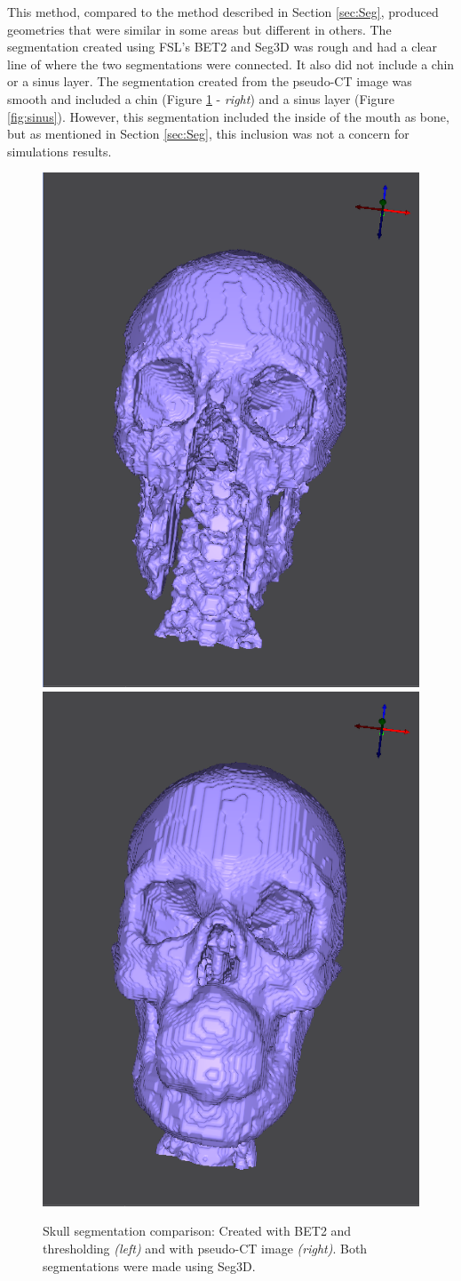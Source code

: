 This method, compared to the method described in Section \ref{sec:Seg}, produced geometries that were similar in some areas but different in others. The segmentation created using FSL's BET2 and Seg3D was rough and had a clear line of where the two segmentations were connected. It also did not include a chin or a sinus layer. The segmentation created from the pseudo-CT image was smooth and included a chin (Figure \ref{fig:skull} - \textit{right}) and a sinus layer (Figure \ref{fig:sinus}). However, this segmentation included the inside of the mouth as bone, but as mentioned in Section \ref{sec:Seg}, this inclusion was not a concern for simulations results.

\begin{figure}[H]
\begin{center}
\includegraphics[width=.49\textwidth]{Figures/skull_before}
\includegraphics[width=.49\textwidth]{Figures/skull_after}
\caption{Skull segmentation comparison: Created with BET2 and thresholding \textit{(left)} and with pseudo-CT image \textit{(right)}. Both segmentations were made using Seg3D.}
\label{fig:skull}
\end{center}
\end{figure}

